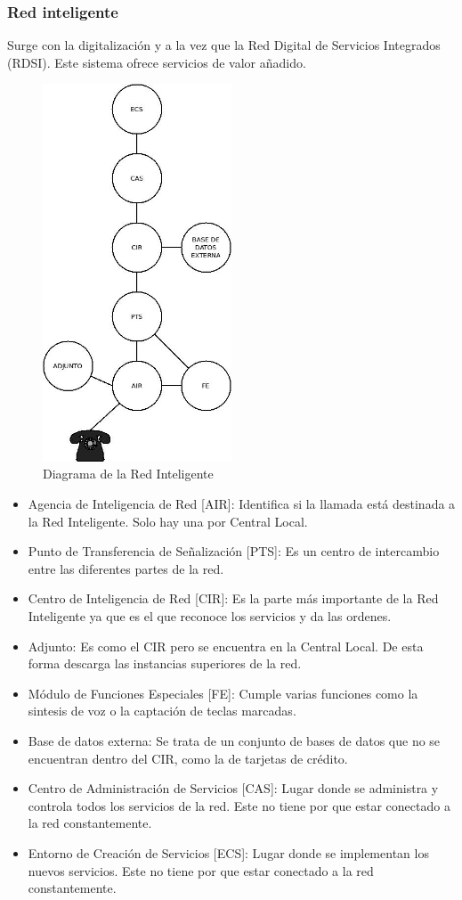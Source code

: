 \subsubsection{Red inteligente}
Surge con la digitalización y a la vez que la Red Digital de Servicios Integrados (RDSI). Este sistema ofrece servicios de valor añadido.
\begin{figure}[H]
\centering
\includegraphics[width=0.5\textwidth]{Imagen/diaredinteligente.jpg}
\caption{Diagrama de la Red Inteligente}
\end{figure}
\begin{itemize}
\item Agencia de Inteligencia de Red [AIR]: Identifica si la llamada está destinada a la Red Inteligente. Solo hay una por Central Local.
\item Punto de Transferencia de Señalización [PTS]: Es un centro de intercambio entre las diferentes partes de la red.
\item Centro de Inteligencia de Red [CIR]: Es la parte más importante de la Red Inteligente ya que es el que reconoce los servicios y da las ordenes.
\item Adjunto: Es como el CIR pero se encuentra en la Central Local. De esta forma descarga las instancias superiores de la red.
\item Módulo de Funciones Especiales [FE]: Cumple varias funciones como la sintesis de voz o la captación de teclas marcadas.
\item Base de datos externa: Se trata de un conjunto de bases de datos que no se encuentran dentro del CIR, como la de tarjetas de crédito.
\item Centro de Administración de Servicios [CAS]: Lugar donde se administra y controla todos los servicios de la red. Este no tiene por que estar conectado a la red constantemente.
\item Entorno de Creación de Servicios [ECS]: Lugar donde se implementan los nuevos servicios. Este no tiene por que estar conectado a la red constantemente.
\end{itemize}